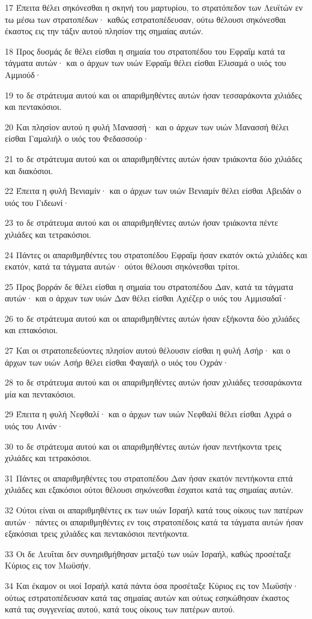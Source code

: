 \par 17 Έπειτα θέλει σηκόνεσθαι η σκηνή του μαρτυρίου, το στρατόπεδον των Λευϊτών εν τω μέσω των στρατοπέδων· καθώς εστρατοπέδευσαν, ούτω θέλουσι σηκόνεσθαι έκαστος εις την τάξιν αυτού πλησίον της σημαίας αυτών.
\par 18 Προς δυσμάς δε θέλει είσθαι η σημαία του στρατοπέδου του Εφραΐμ κατά τα τάγματα αυτών· και ο άρχων των υιών Εφραΐμ θέλει είσθαι Ελισαμά ο υιός του Αμμιούδ·
\par 19 το δε στράτευμα αυτού και οι απαριθμηθέντες αυτών ήσαν τεσσαράκοντα χιλιάδες και πεντακόσιοι.
\par 20 Και πλησίον αυτού η φυλή Μανασσή· και ο άρχων των υιών Μανασσή θέλει είσθαι Γαμαλιήλ ο υιός του Φεδασσούρ·
\par 21 το δε στράτευμα αυτού και οι απαριθμηθέντες αυτών ήσαν τριάκοντα δύο χιλιάδες και διακόσιοι.
\par 22 Έπειτα η φυλή Βενιαμίν· και ο άρχων των υιών Βενιαμίν θέλει είσθαι Αβειδάν ο υιός του Γιδεωνί·
\par 23 το δε στράτευμα αυτού και οι απαριθμηθέντες αυτών ήσαν τριάκοντα πέντε χιλιάδες και τετρακόσιοι.
\par 24 Πάντες οι απαριθμηθέντες του στρατοπέδου Εφραΐμ ήσαν εκατόν οκτώ χιλιάδες και εκατόν, κατά τα τάγματα αυτών· ούτοι θέλουσι σηκόνεσθαι τρίτοι.
\par 25 Προς βορράν δε θέλει είσθαι η σημαία του στρατοπέδου Δαν, κατά τα τάγματα αυτών· και ο άρχων των υιών Δαν θέλει είσθαι Αχιέζερ ο υιός του Αμμισαδαΐ·
\par 26 το δε στράτευμα αυτού και οι απαριθμηθέντες αυτών ήσαν εξήκοντα δύο χιλιάδες και επτακόσιοι.
\par 27 Και οι στρατοπεδεύοντες πλησίον αυτού θέλουσιν είσθαι η φυλή Ασήρ· και ο άρχων των υιών Ασήρ θέλει είσθαι Φαγαιήλ ο υιός του Οχράν·
\par 28 το δε στράτευμα αυτού και οι απαριθμηθέντες αυτών ήσαν χιλιάδες τεσσαράκοντα μία και πεντακόσιοι.
\par 29 Έπειτα η φυλή Νεφθαλί· και ο άρχων των υιών Νεφθαλί θέλει είσθαι Αχιρά ο υιός του Αινάν·
\par 30 το δε στράτευμα αυτού και οι απαριθμηθέντες αυτών ήσαν πεντήκοντα τρεις χιλιάδες και τετρακόσιοι.
\par 31 Πάντες οι απαριθμηθέντες του στρατοπέδου Δαν ήσαν εκατόν πεντήκοντα επτά χιλιάδες και εξακόσιοι ούτοι θέλουσι σηκόνεσθαι έσχατοι κατά τας σημαίας αυτών.
\par 32 Ούτοι είναι οι απαριθμηθέντες εκ των υιών Ισραήλ κατά τους οίκους των πατέρων αυτών· πάντες οι απαριθμηθέντες εν τοις στρατοπέδοις κατά τα τάγματα αυτών ήσαν εξακόσιαι τρεις χιλιάδες και πεντακόσιοι πεντήκοντα.
\par 33 Οι δε Λευΐται δεν συνηριθμήθησαν μεταξύ των υιών Ισραήλ, καθώς προσέταξε Κύριος εις τον Μωϋσήν.
\par 34 Και έκαμον οι υιοί Ισραήλ κατά πάντα όσα προσέταξε Κύριος εις τον Μωϋσήν· ούτως εστρατοπέδευσαν κατά τας σημαίας αυτών και ούτως εσηκώθησαν έκαστος κατά τας συγγενείας αυτού, κατά τους οίκους των πατέρων αυτού.

